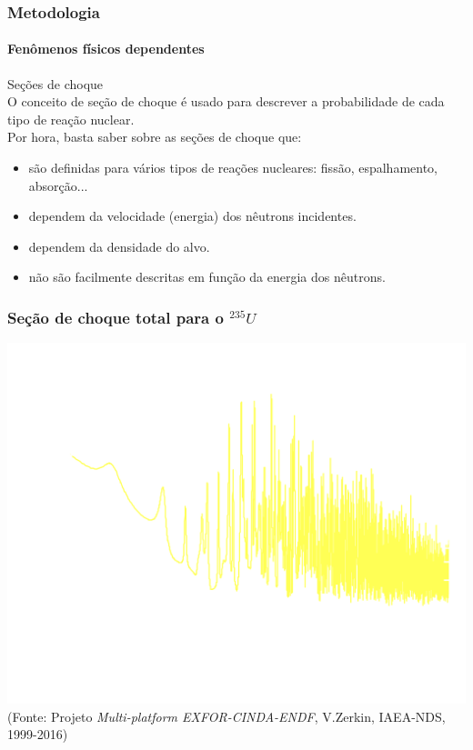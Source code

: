\documentclass[svgnames,smaller,table]{beamer}
\begin{document}
\begin{frame}
  \frametitle{Metodologia}
  \framesubtitle{Fenômenos físicos dependentes}
  \centering
  \alert{Seções de choque}
  \\
  \vspace{0.5cm}
  O conceito de seção de choque é usado para descrever a probabilidade de cada
  tipo de reação nuclear.
  \\
  \vspace{0.5cm}
  Por hora, basta saber sobre as seções de choque que:
  \begin{itemize}
  \item são definidas para vários tipos de reações nucleares: fissão, espalhamento, absorção...
  \item dependem da velocidade (energia) dos nêutrons incidentes.
  \item dependem da densidade do alvo.
  \item \alert{não} são facilmente descritas em função da energia dos nêutrons.
  \end{itemize}
  
\end{frame}

{

  \begin{frame}
  \frametitle{Seção de choque total para o $^{235}U$}
  \centering\includegraphics[scale=0.15]{../figuras/cu-neg.png}
  \\
  \centering
  \scriptsize{(Fonte: Projeto \textit{Multi-platform EXFOR-CINDA-ENDF}, V.Zerkin, IAEA-NDS, 1999-2016)}
\end{frame}
}
\end{document}
